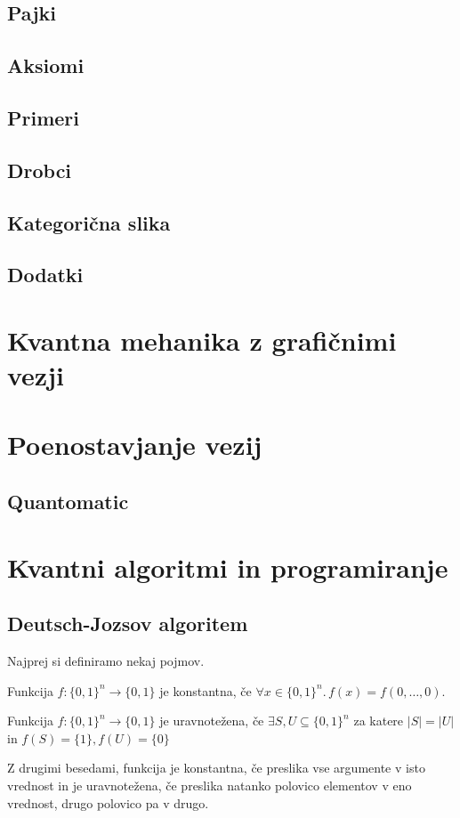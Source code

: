 \documentclass[mat1]{fmfdelo}
\newcommand{\sep}{\ensuremath{.\,}}
\begin{document}
\subsection{Pajki}
\subsection{Aksiomi}
\subsection{Primeri}
\subsection{Drobci}
\subsection{Kategorična slika}
\subsection{Dodatki}
\section{Kvantna mehanika z grafičnimi vezji}
\section{Poenostavjanje vezij}
\subsection{Quantomatic}
\section{Kvantni algoritmi in programiranje}
\subsection{Deutsch-Jozsov algoritem}
Najprej si definiramo nekaj pojmov.
\begin{definicija} Funkcija \(f:\{0,1\}^n\to \{0,1\}\) je konstantna, če \(\forall x\in\{0,1\}^n\sep f(x) = f(0,\ldots, 0)\).\end{definicija}
\begin{definicija}
    Funkcija \(f: \{0,1\}^n \to \{0,1\}\) je uravnotežena, če \(\exists S, U\subseteq \{0,1\}^n\) za katere \(\lvert S\rvert = \lvert U\rvert\) in \(f(S) = \{1\}, f(U) = \{0\}\)
\end{definicija}
Z drugimi besedami, funkcija je konstantna, če preslika vse argumente v isto vrednost in je uravnotežena, če preslika natanko polovico elementov v eno vrednost, drugo polovico pa v drugo.
\end{document}
